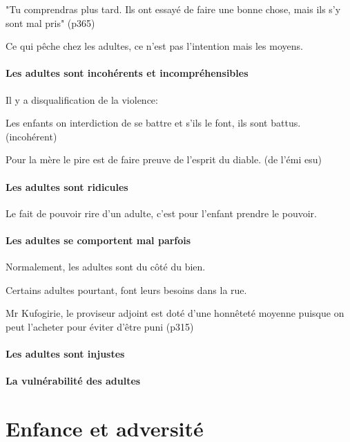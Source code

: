 \documentclass[a4paper, 11pt, hidelinks]{article}
\newcommand{\bs}{\bigskip}
\begin{document}
"Tu comprendras plus tard. Ils ont essayé de faire une bonne chose, mais ils s'y sont mal pris" (p365)
\bs

Ce qui pêche chez les adultes, ce n'est pas l'intention mais les moyens.


\paragraph{Les adultes sont incohérents et incompréhensibles}


Il y a disqualification de la violence:

Les enfants on interdiction de se battre et s'ils le font, ils sont battus. (incohérent)
\bs



Pour la mère le pire est de faire preuve de l'esprit du diable. (de l'émi esu)



\paragraph{Les adultes sont ridicules}

Le fait de pouvoir rire d'un adulte, c'est pour l'enfant prendre le pouvoir.


\paragraph{Les adultes se comportent mal parfois}

Normalement, les adultes sont du côté du bien.


Certains adultes pourtant, font leurs besoins dans la rue.

Mr Kufogirie, le proviseur adjoint est doté d'une honnêteté moyenne puisque on peut l'acheter pour éviter d'être puni (p315)




\paragraph{Les adultes sont injustes}




\paragraph{La vulnérabilité des adultes}




\section{Enfance et adversité}
\end{document}
